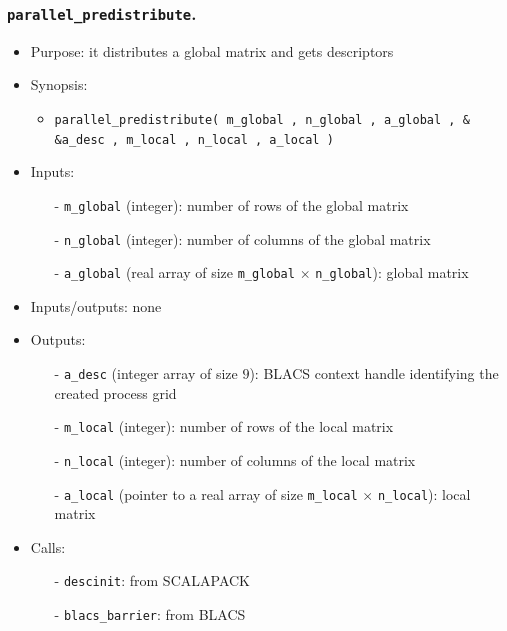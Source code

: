 \documentclass[12pt]{article}
\begin{document}
\subsubsection{{\tt parallel\_predistribute}.}
\begin{itemize}
\item Purpose: it distributes a global matrix and gets descriptors
\item Synopsis: 
\begin{itemize}
\item {\tt parallel\_predistribute( m\_global , n\_global , a\_global , \& \\ \&a\_desc , m\_local , n\_local , a\_local )}
\end{itemize}
\item Inputs: 
\begin{itemize}
\item[-] {\tt m\_global} (integer): number of rows of the global matrix
\item[-] {\tt n\_global} (integer): number of columns of the global matrix
\item[-] {\tt a\_global} (real array of size {\tt m\_global} $\times$ {\tt n\_global}): global matrix
\end{itemize}
\item Inputs/outputs: none
\item Outputs:
\begin{itemize}
\item[-] {\tt a\_desc} (integer array of size $9$): BLACS context handle identifying the created process grid
\item[-] {\tt m\_local} (integer): number of rows of the local matrix
\item[-] {\tt n\_local} (integer): number of columns of the local matrix
\item[-] {\tt a\_local} (pointer to a real array of size {\tt m\_local} $\times$ {\tt n\_local}): local matrix
\end{itemize}
\item Calls: 
\begin{itemize}
\item[-] {\tt descinit}: from SCALAPACK
\item[-] {\tt blacs\_barrier}: from BLACS
\end{itemize}
\end{itemize} 
\end{document}
